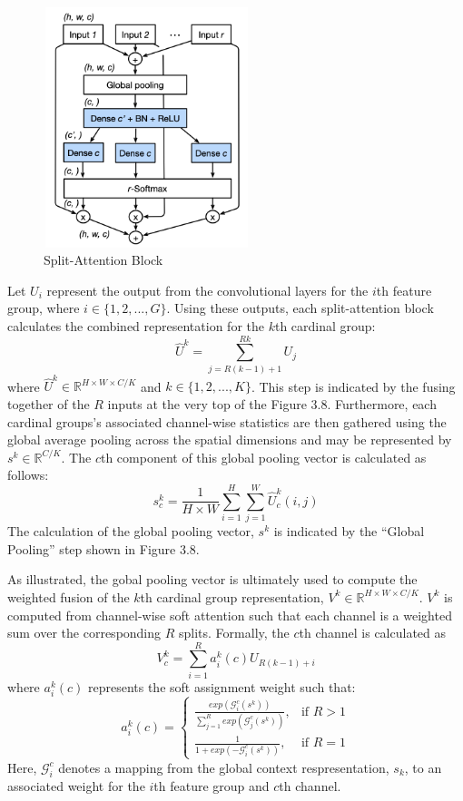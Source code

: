 \documentclass [MAS] {uclathes}
\begin{document}
\begin{figure}[h]
\centering
\includegraphics[height = 70mm, width= 60mm]{imgs/split_att.png}
\caption{Split-Attention Block}
\label{fig:split_att_block}
\end{figure}


Let $U_i$ represent the output from the convolutional layers for the $i$th feature group, where $i \in \{1, 2, ..., G \}$. Using these outputs, each split-attention block calculates the combined representation for the $k$th cardinal group: $$\hat{U}^k = \sum_{j = R(k-1)+1}^{Rk} U_j$$ where $\hat{U}^k \in \mathbb{R}^{H \times W \times C/K}$ and $k \in \{1, 2, ..., K\}$. This step is indicated by the fusing together of the $R$ inputs at the very top of the Figure 3.8. Furthermore, each cardinal groups's associated channel-wise statistics are then gathered using the global average pooling across the spatial dimensions and may be represented by $s^k \in \mathbb{R}^{C/K}$. The $c$th component of this global pooling vector is calculated as follows: $$s_{c}^{k} = \frac{1}{H \times W} \sum_{i = 1}^{H} \sum_{j = 1}^{W} \hat{U}_{c}^{k}(i, j)$$ The calculation of the global pooling vector, $s^k$ is indicated by the ``Global Pooling'' step shown in Figure 3.8. 

As illustrated, the gobal pooling vector is ultimately used to compute the weighted fusion of the $k$th cardinal group 
representation, $V^k \in \mathbb{R}^{H \times W \times C/K}$. $V^k$ is computed from channel-wise soft attention such that each channel is a weighted sum over the corresponding $R$ splits. Formally, the $c$th channel is calculated as $$V_{c}^{k} = \sum_{i = 1}^{R} a_{i}^{k}(c) U_{R(k-1) + i}$$ where $a_{i}^{k}(c)$ represents the soft assignment weight such that: \[  a_{i}^{k}(c)= \begin{cases} \frac{exp(\mathcal{G}_{i}^c(s^k))}{\sum_{j=1}^{R} exp(\mathcal{G}_{j}^c(s^k))}, & \text{if } R > 1\\ \frac{1}{1 + exp(-\mathcal{G}_{i}^c(s^k))}, & \text{if } R = 1 \end{cases} \] Here, $\mathcal{G}_{i}^{c}$ denotes a mapping from the global context respresentation, $s_k$, to an associated weight for the $i$th feature group and $c$th channel. 
\end{document}
